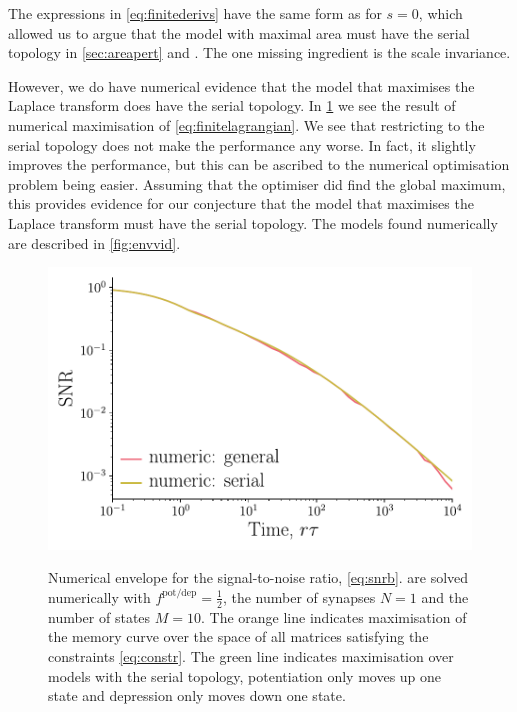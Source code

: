 \documentclass[12pt]{article}
\newcommand{\potdep}{^{\text{pot/dep}}}
\begin{document}
The expressions in \cref{eq:finitederivs} have the same form as for \(s=0\), which allowed us to argue that the model with maximal area must have the serial topology in \cref{sec:areapert} and \cite{Lahiri2013synapse}.
The one missing ingredient is the scale invariance.

However, we do have numerical evidence that the model that maximises the Laplace transform does have the serial topology.
In \cref{fig:envnum} we see the result of numerical maximisation of \cref{eq:finitelagrangian}.
We see that restricting to the serial topology does not make the performance any worse.
In fact, it slightly improves the performance, but this can be ascribed to the numerical optimisation problem being easier.
Assuming that the optimiser did find the global maximum, this provides evidence for our conjecture that the model that maximises the Laplace transform must have the serial topology.
The models found numerically are described in \cref{fig:envvid}.

\begin{figure}[tb]
  \centering
  \includegraphics[width=0.8\linewidth]{LenvNumOnly.pdf}\\
  \caption[Numerical envelope for the signal-to-noise ratio]
  {Numerical envelope for the signal-to-noise ratio, \eqref{eq:snrb}. 
   are solved numerically with \(f\potdep=\frac{1}{2}\), the number of synapses \(N=1\) and the number of states \(M=10\).
  The orange line indicates maximisation of the memory curve over the space of all matrices satisfying the constraints \eqref{eq:constr}.
  The green line indicates maximisation over models with the serial topology, \ie potentiation only moves up one state and depression only moves down one state.
  }\label{fig:envnum}
\end{figure}
\end{document}
